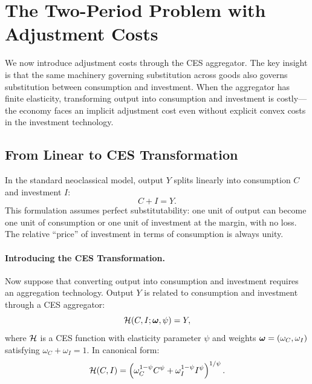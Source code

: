 \section{The Two-Period Problem with Adjustment Costs}
\label{sec:ac-two-period}

We now introduce adjustment costs through the CES aggregator. The key insight is that the same machinery governing substitution across goods also governs substitution between consumption and investment. When the aggregator has finite elasticity, transforming output into consumption and investment is costly---the economy faces an implicit adjustment cost even without explicit convex costs in the investment technology.

\subsection{From Linear to CES Transformation}
\label{subsec:ac-linear-to-ces}

In the standard neoclassical model, output $Y$ splits linearly into consumption $C$ and investment $I$:
\begin{equation}
C + I = Y.
\label{eq:ac-linear-constraint}
\end{equation}
This formulation assumes perfect substitutability: one unit of output can become one unit of consumption or one unit of investment at the margin, with no loss. The relative ``price'' of investment in terms of consumption is always unity.

\paragraph{Introducing the CES Transformation.}
Now suppose that converting output into consumption and investment requires an aggregation technology. Output $Y$ is related to consumption and investment through a CES aggregator:
\begin{equation}
\mathcal{H}(C, I; \boldsymbol{\omega}, \psi) = Y,
\label{eq:ac-ces-constraint}
\end{equation}
where $\mathcal{H}$ is a CES function with elasticity parameter $\psi$ and weights $\boldsymbol{\omega} = (\omega_C, \omega_I)$ satisfying $\omega_C + \omega_I = 1$. In canonical form:
\begin{equation}
\mathcal{H}(C, I) = \left( \omega_C^{1-\psi} C^{\psi} + \omega_I^{1-\psi} I^{\psi} \right)^{1/\psi}.
\label{eq:ac-H-canonical}
\end{equation}

